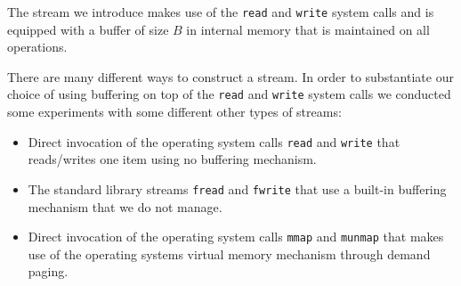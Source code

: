 \documentclass[twoside,11pt,openright]{report}
\begin{document}
The stream we introduce makes use of the \texttt{read} and \texttt{write} system calls and is equipped with a buffer of size $B$ in internal memory that is maintained on all operations.

There are many different ways to construct a stream. In order to substantiate our choice of using buffering on top of the \texttt{read} and \texttt{write} system calls we conducted some experiments with some different other types of streams:

\begin{itemize}
	\item Direct invocation of the operating system calls \texttt{read} and \texttt{write} that reads\-/writes one item using no buffering mechanism.
	\item The standard library streams \texttt{fread} and \texttt{fwrite} that use a built\--in buffering mechanism that we do not manage.
	\item Direct invocation of the operating system calls \texttt{mmap} and \texttt{munmap} that makes use of the operating systems virtual memory mechanism through demand paging.
\end{itemize}
\end{document}
